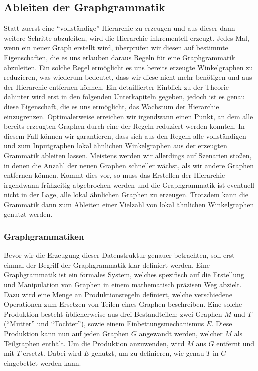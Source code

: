 \subsection{Ableiten der Graphgrammatik}
Statt zuerst eine ``vollständige'' Hierarchie zu erzeugen und aus
dieser dann weitere Schritte abzuleiten, wird die Hierarchie inkrementell erzeugt. Jedes Mal, wenn ein neuer Graph erstellt wird, überprüfen
wir diesen auf bestimmte Eigenschaften, die es uns erlauben daraus Regeln für eine Graphgrammatik abzuleiten. Ein solche Regel ermöglicht es
uns bereits erzeugte Winkelgraphen zu reduzieren, was wiederum bedeutet, dass wir diese nicht mehr benötigen und aus der Hierarchie entfernen
können. Ein detaillierter Einblick zu der Theorie dahinter wird erst in den folgenden Unterkapiteln gegeben, jedoch ist es genau diese Eigenschaft,
die es uns ermöglicht, das Wachstum der Hierarchie einzugrenzen. Optimalerweise erreichen wir irgendwann einen Punkt, an dem alle bereits erzeugten
Graphen durch eine der Regeln reduziert werden konnten. In diesem Fall können wir garantieren, dass sich aus den Regeln alle vollständigen
und zum Inputgraphen lokal ähnlichen Winkelgraphen aus der erzeugten Grammatik ableiten lassen. Meistens werden wir allerdings auf
Szenarien stoßen, in denen die Anzahl der neuen Graphen schneller wächst, als wir andere Graphen entfernen können. Kommt dies vor, so muss das
Erstellen der Hierarchie irgendwann frühzeitig abgebrochen werden und die Graphgrammatik ist eventuell nicht in der Lage, alle lokal ähnlichen
Graphen zu erzeugen. Trotzdem kann die Grammatik dann zum Ableiten einer Vielzahl von lokal ähnlichen Winkelgraphen genutzt werden.

\subsubsection{Graphgrammatiken}
Bevor wir die Erzeugung dieser Datenstruktur genauer betrachten, soll erst einmal der Begriff der Graphgrammatik klar definiert werden.
Eine Graphgrammatik ist ein formales System, welches spezifisch auf die Erstellung und Manipulation von Graphen in einem mathematisch
präzisen Weg abzielt. Dazu wird eine Menge an Produktionsregeln definiert, welche verschiedene Operationen zum Ersetzen von Teilen
eines Graphen beschreiben. Eine solche Produktion besteht üblicherweise aus drei Bestandteilen: zwei Graphen \(M\) und \(T\) (``Mutter'' und
``Tochter''), sowie einem Einbettungsmechanismus \(E\). Diese Produktion kann nun auf jeden Graphen \(G\) angewandt werden, welcher \(M\)
als Teilgraphen enthält. Um die Produktion anzuwenden, wird \(M\) aus \(G\) entfernt und mit \(T\) ersetzt. Dabei wird \(E\) genutzt, um zu
definieren, wie genau \(T\) in \(G\) eingebettet werden kann. \cite{31_engelfriet_rozenberg}

